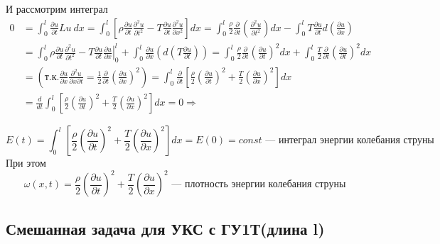 И рассмотрим интеграл
\begin{align*}
	0 & = \int_0^l \frac{\partial u}{\partial t} Lu\ dx = \int_0^l\left[\rho \frac{\partial u}{\partial t} \frac{\partial^2 u}{\partial t^2} -T \frac{\partial u}{\partial t} \frac{\partial^2 u}{\partial x^2} \right]dx = \int_0^l \frac{\rho}{2} \frac{\partial}{\partial t}\left(\frac{\partial^2 u}{\partial t^2} \right)dx - \int_0^l T \frac{\partial u}{\partial t} d\left(\frac{\partial u}{\partial x} \right)                                                                      \\
	  & = \int_0^l \rho \frac{\partial u}{\partial t} \frac{\partial^2 u}{\partial t^2} - T \frac{\partial u}{\partial t} \left. \frac{\partial u}{\partial x}\right|_0^l + \int_0^l \frac{\partial u}{\partial x} \left(d \left(T \frac{\partial u}{\partial t} \right) \right) = \int_0^l \frac{\rho}{2} \frac{\partial}{\partial t} \left( \frac{\partial u}{\partial t} \right)^2 dx + \int_0^l \frac{T}{2} \frac{\partial}{\partial t} \left( \frac{\partial u}{\partial t} \right)^2 dx \\
	  & = \left(\text{т.к.} \frac{\partial u}{\partial x} \frac{\partial^2 u}{\partial x \partial t} =
	\frac{1}{2} \frac{\partial }{\partial t} \left( \frac{\partial u}{\partial x} \right)^2
	\right) = \int_0^l \frac{\partial}{\partial t} \left[ \frac{\rho}{2} \left( \frac{\partial u}{\partial t} \right)^2 + \frac{T}{2}\left( \frac{\partial u}{\partial x} \right)^2 \right] dx                                                                                                                                                                                                                                                                                                \\
	  & = \frac{d}{dt} \int_0^l \left[ \frac{\rho}{2} \left( \frac{\partial u}{\partial t} \right)^2 + \frac{T}{2}\left( \frac{\partial u}{\partial x} \right)^2 \right]dx = 0 \Rightarrow
\end{align*}

\[
	E(t) = \int_0^l \left[ \frac{\rho}{2} \left( \frac{\partial u}{\partial t} \right)^2 + \frac{T}{2}\left( \frac{\partial u}{\partial x} \right)^2 \right]dx = E(0) = const \text{ --- интеграл энергии колебания струны}
\]
При этом
\[
	\omega(x, t) = \frac{\rho}{2} \left( \frac{\partial u}{\partial t} \right)^2 + \frac{T}{2}\left( \frac{\partial u}{\partial x} \right)^2 \text{ --- плотность энергии колебания струны}
\]

\subsection{Смешанная задача для УКС с ГУ1Т(длина l)}

